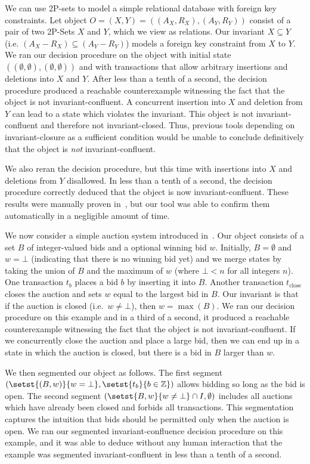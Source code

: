 We can use 2P-sets to model a simple relational database with foreign key
constraints. Let object $O = (X, Y) = ((A_X, R_X), (A_Y, R_Y))$ consist of a
pair of two 2P-Sets $X$ and $Y$, which we view as relations. Our invariant $X
\subseteq Y$ (i.e. $(A_X - R_X) \subseteq (A_Y - R_Y)$) models a foreign key
constraint from $X$ to $Y$. We ran our decision procedure on the object with
initial state $((\emptyset, \emptyset), (\emptyset, \emptyset))$ and
with transactions that allow arbitrary insertions and deletions into $X$ and
$Y$. After less than a tenth of a second, the decision procedure produced a
reachable counterexample witnessing the fact that the object is not
invariant-confluent. A concurrent insertion into $X$ and deletion from $Y$ can
lead to a state which violates the invariant. This object is not
invariant-confluent and therefore not invariant-closed. Thus, previous tools
depending on invariant-closure as a sufficient condition would be unable to
conclude definitively that the object is \emph{not} invariant-confluent.

We also reran the decision procedure, but this time with insertions into $X$
and deletions from $Y$ disallowed. In less than a tenth of a second, the
decision procedure correctly deduced that the object is now
invariant-confluent. These results were manually proven
in~\cite{bailis2014coordination}, but our tool was able to confirm them
automatically in a negligible amount of time.

\example[Auction]
We now consider a simple auction system introduced in~\cite{gotsman2016cause}.
Our object consists of a set $B$ of integer-valued bids and a optional winning
bid $w$. Initially, $B = \emptyset$ and $w = \bot$ (indicating that there is no
winning bid yet) and we merge states by taking the union of $B$ and the maximum
of $w$ (where $\bot < n$ for all integers $n$). One transaction $t_b$ places a bid
$b$ by inserting it into $B$. Another transaction $t_\text{close}$ closes the
auction and sets $w$ equal to the largest bid in $B$. Our invariant is that if
the auction is closed (i.e.\ $w \neq \bot$), then $w = \max(B)$. We ran our
decision procedure on this example and in a third of a second, it produced a
reachable counterexample witnessing the fact that the object is not
invariant-confluent.  If we concurrently close the auction and place a large
bid, then we can end up in a state in which the auction is closed, but there is
a bid in $B$ larger than $w$.

We then segmented our object as follows. The first segment $(\setst{(B, w)}{w =
\bot}, \setst{t_b}{b \in \ints})$ allows bidding so long as the bid is open.
The second segment $(\setst{B, w}{w \neq \bot} \cap I, \emptyset)$ includes all
auctions which have already been closed and forbids all transactions. This
segmentation captures the intuition that bids should be permitted only when the
auction is open. We ran our segmented invariant-confluence decision procedure
on this example, and it was able to deduce without any human interaction that
the example was segmented invariant-confluent in less than a tenth of a second.

